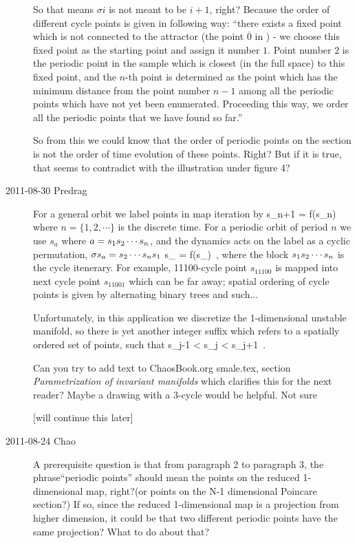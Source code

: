 \begin{description}
So that means $\sigma i$ is not meant to be $i+1$, right? Because the order of different cycle points is given in following way: ``there exists a fixed point which
is not connected to the attractor (the point
$\overline{0}$ in ) - we
choose this fixed point
as the starting point and assign it number $1$.
Point number $2$ is the periodic point in the sample
which is closest (in the full space)
to this fixed point, and the $n$-th point is determined as the point
which has the minimum distance from the point number $n-1$ among
all the periodic points which have not yet been enumerated.
Proceeding this way, we order all the periodic points that we have found
so far.''

So from this we could know that the order of periodic points on the section is not the order of time evolution of these points. Right? But if it is true, that seems to contradict with the illustration under figure 4?

\item[2011-08-30 Predrag]
For a general orbit we  label points in map iteration by
\beq
s_{n+1} = f(s_n)
where $n=\{1,2,\cdots\}$ is the discrete time.
For a periodic orbit of period $n$ we use $s_a$
where $a = {s_{1}}{s_{2}}\cdots{\ensuremath{s_{n}}}$, and the
dynamics acts on the label as a cyclic permutation,
$\sigma s_a = {s_{2}}\cdots{\ensuremath{s_{n}}}{\ensuremath{s_{1}}}$
\beq
s_{\cdots{}} =
    f(s_{\cdots{}})
\,,
where the block ${s_{1}}{s_{2}}\cdots{\ensuremath{s_{n}}}$ is the
cycle itenerary.
For example, 11100-cycle point $s_{11100}$ is mapped into
next cycle point $s_{11001}$ which can be far away; spatial
ordering of cycle points is given by alternating binary trees
and such...

Unfortunately, in this application we discretize the 1-dimensional unstable manifold, so there is yet another integer
suffix which refers to a spatially ordered
set of points, such that
\beq
s_{j-1} < s_{j} < s_{j+1}
\,.

Can you try to add text to ChaosBook.org
smale.tex, section {\em Parametrization of invariant manifolds}
which clarifies this for the next reader? Maybe a drawing with
a 3-cycle would be helpful. Not sure

[will continue this later]


\item[2011-08-24 Chao]
A prerequisite question is that from paragraph 2 to paragraph 3, the
phrase``periodic points'' should mean the points on the reduced
1-dimensional map, right?(or points on the N-1 dimensional Poincare
section?) If so, since the reduced 1-dimensional map is a projection from
higher dimension, it could be that two different periodic points have the
same projection? What to do about that?



\end{description}
